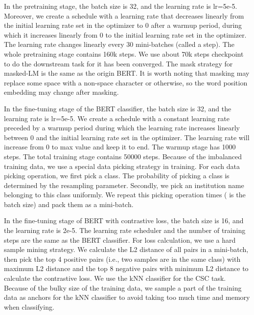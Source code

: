 \documentclass{article}
\begin{document}
In the pretraining stage, the batch size is 32, and the learning rate is lr=5e-5. Moreover, we create a schedule with a learning rate that decreases linearly from the initial learning rate set in the optimizer to 0 after a warmup period, during which it increases linearly from 0 to the initial learning rate set in the optimizer. The learning rate changes linearly every 30 mini-batches (called a step). The whole pretraining stage contains 160k steps. We use about 70k steps checkpoint to do the downstream task for it has been converged. The mask strategy for masked-LM is the same as the origin BERT. It is worth noting that masking may replace some space with a non-space character or otherwise, so the word position embedding may change after masking.

In the fine-tuning stage of the BERT classifier, the batch size is 32, and the learning rate is lr=5e-5. We create a schedule with a constant learning rate preceded by a warmup period during which the learning rate increases linearly between 0 and the initial learning rate set in the optimizer. The learning rate will increase from 0 to max value and keep it to end. The warmup stage has 1000 steps. The total training stage contains 50000 steps. Because of the imbalanced training data, we use a special data picking strategy in training. For each data picking operation, we first pick a class. The probability of picking a class is determined by the resampling parameter. Secondly, we pick an institution name belonging to this class uniformly. We repeat this picking operation  times ( is the batch size) and pack them as a mini-batch.

In the fine-tuning stage of BERT with contrastive loss, the batch size is 16, and the learning rate is 2e-5. The learning rate scheduler and the number of training steps are the same as the BERT classifier. 
For loss calculation, we use a hard sample mining strategy. We calculate the L2 distance of all pairs in a mini-batch, then pick the top 4 positive pairs (i.e., two samples are in the same class) with maximum L2 distance and the top 8 negative pairs with minimum L2 distance to calculate the contrastive loss. We use the kNN classifier for the CSC task. Because of the bulky size of the training data, we sample a part of the training data as anchors for the kNN classifier to avoid taking too much time and memory when classifying. 
\end{document}
